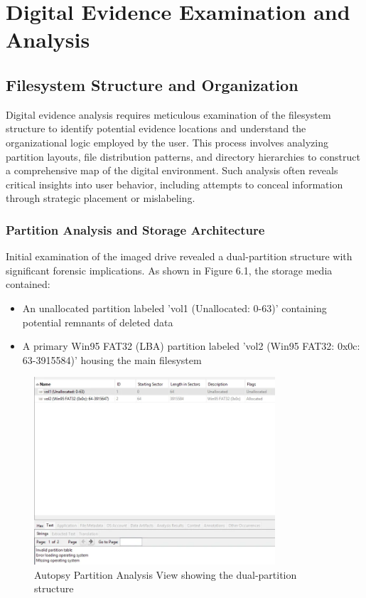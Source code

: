 \chapter{Digital Evidence Examination and Analysis}

\section{Filesystem Structure and Organization}
Digital evidence analysis requires meticulous examination of the filesystem structure to identify potential evidence locations and understand the organizational logic employed by the user. This process involves analyzing partition layouts, file distribution patterns, and directory hierarchies to construct a comprehensive map of the digital environment. Such analysis often reveals critical insights into user behavior, including attempts to conceal information through strategic placement or mislabeling.

\subsection{Partition Analysis and Storage Architecture}
Initial examination of the imaged drive revealed a dual-partition structure with significant forensic implications. As shown in Figure 6.1, the storage media contained:

\begin{itemize}
    \item An unallocated partition labeled 'vol1 (Unallocated: 0-63)' containing potential remnants of deleted data
    \item A primary Win95 FAT32 (LBA) partition labeled 'vol2 (Win95 FAT32: 0x0c: 63-3915584)' housing the main filesystem
\end{itemize}

\begin{figure}[h]
    \centering
    \includegraphics[width=0.8\textwidth]{images/Evidence Examination/Image1.png}
    \caption{Autopsy Partition Analysis View showing the dual-partition structure}
    \label{fig:partition_structure}
\end{figure}

